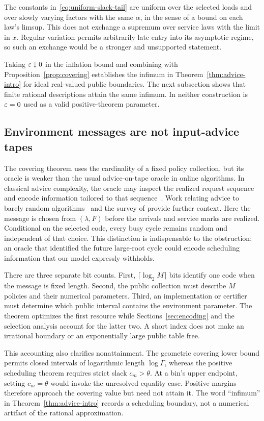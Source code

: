 The constants in~\eqref{eq:uniform-slack-tail} are uniform over the selected loads and over slowly varying factors with the same $\alpha$, in the sense of a bound on each law's limsup. This does not exchange a supremum over service laws with the limit in $x$. Regular variation permits arbitrarily late entry into its asymptotic regime, so such an exchange would be a stronger and unsupported statement.

Taking $\varepsilon\downarrow0$ in the inflation bound and combining with Proposition~\ref{prop:covering} establishes the infimum in Theorem~\ref{thm:advice-intro} for ideal real-valued public boundaries. The next subsection shows that finite rational descriptions attain the same infimum. In neither construction is $\varepsilon=0$ used as a valid positive-theorem parameter.

\subsection{Environment messages are not input-advice tapes}\label{sec:message-vs-advice}
The covering theorem uses the cardinality of a fixed policy collection, but its oracle is weaker than the usual advice-on-tape oracle in online algorithms. In classical advice complexity, the oracle may inspect the realized request sequence and encode information tailored to that sequence~\cite{bocken2009,hromkovic2010,emek2011}. Work relating advice to barely random algorithms~\cite{komm2011} and the survey of \cite{boyar2016} provide further context. Here the message is chosen from $(\lambda,F)$ before the arrivals and service marks are realized. Conditional on the selected code, every busy cycle remains random and independent of that choice. This distinction is indispensable to the obstruction: an oracle that identified the future large-root cycle could encode scheduling information that our model expressly withholds.

There are three separate bit counts.  First, $\lceil\log_2 M\rceil$ bits identify one code when the message is fixed length.  Second, the public collection must describe $M$ policies and their numerical parameters.  Third, an implementation or certifier must determine which public interval contains the environment parameter.  The theorem optimizes the first resource while Sections~\ref{sec:encoding} and the selection analysis account for the latter two.  A short index does not make an irrational boundary or an exponentially large public table free.

This accounting also clarifies nonattainment.  The geometric covering lower bound permits closed intervals of logarithmic length $\log\Gamma$, whereas the positive scheduling theorem requires strict slack $c_m>\theta$.  At a bin's upper endpoint, setting $c_m=\theta$ would invoke the unresolved equality case.  Positive margins therefore approach the covering value but need not attain it.  The word ``infimum'' in Theorem~\ref{thm:advice-intro} records a scheduling boundary, not a numerical artifact of the rational approximation.

